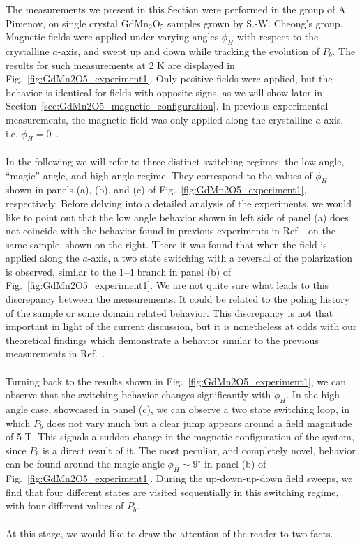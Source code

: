 The measurements we present in this Section were performed in the group of A. Pimenov, on single crystal GdMn$_2$O$_5$ samples grown by S.-W. Cheong's group.
Magnetic fields were applied under varying angles $\phi_H$ with respect to the crystalline $a$-axis, and swept up and down while tracking the evolution of $P_b$.
The results for such measurements at 2 K are displayed in Fig.~\ref{fig:GdMn2O5_experiment1}.
Only positive fields were applied, but the behavior is identical for fields with opposite signs, as we will show later in Section~\ref{sec:GdMn2O5_magnetic_configuration}. 
In previous experimental measurements, the magnetic field was only applied along the crystalline $a$-axis, i.e. $\phi_H = 0$~\cite{Lee13}.
\\\\
In the following we will refer to three distinct switching regimes: the low angle, ``magic'' angle, and high angle regime.
They correspond to the values of $\phi_H$ shown in panels (a), (b), and (c) of Fig.~\ref{fig:GdMn2O5_experiment1}, respectively.
Before delving into a detailed analysis of the experiments, we would like to point out that the low angle behavior shown in left side of panel (a) does not coincide with the behavior found in previous experiments in Ref.~\cite{Lee13} on the same sample, shown on the right.
There it was found that when the field is applied along the $a$-axis, a two state switching with a reversal of the polarization is observed, similar to the 1--4 branch in panel (b) of Fig.~\ref{fig:GdMn2O5_experiment1}.
We are not quite sure what leads to this discrepancy between the measurements. It could be related to the poling history of the sample or some domain related behavior.
This discrepancy is not that important in light of the current discussion, but it is nonetheless at odds with our theoretical findings which demonstrate a behavior similar to the previous measurements in Ref.~\cite{Lee13}. 
\\\\
Turning back to the results shown in Fig.~\ref{fig:GdMn2O5_experiment1}, we can observe that the switching behavior changes significantly with $\phi_H$.
In the high angle case, showcased in panel (c), we can observe a two state switching loop, in which $P_b$ does not vary much but a clear jump appears around a field magnitude of 5 T.
This signals a sudden change in the magnetic configuration of the system, since $P_b$ is a direct result of it.
The most peculiar, and completely novel, behavior can be found around the magic angle $\phi_H \sim 9^\circ$ in panel (b) of Fig.~\ref{fig:GdMn2O5_experiment1}.
During the up-down-up-down field sweeps, we find that four different states are visited sequentially in this switching regime, with four different values of $P_b$.
\\\\
At this stage, we would like to draw the attention of the reader to two facts.


